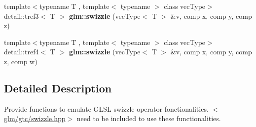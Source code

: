 \begin{DoxyCompactItemize}
\item 
\hypertarget{group__gtc__swizzle_ga93106a77480696f43f6f16653cdab940}{{\footnotesize template$<$typename T , template$<$ typename $>$ class vec\-Type$>$ }\\detail\-::tref3$<$ T $>$ {\bfseries glm\-::swizzle} (vec\-Type$<$ T $>$ \&v, comp x, comp y, comp z)}\label{group__gtc__swizzle_ga93106a77480696f43f6f16653cdab940}

\item 
\hypertarget{group__gtc__swizzle_gab79abf7b57f5482982bc87bfa924920a}{{\footnotesize template$<$typename T , template$<$ typename $>$ class vec\-Type$>$ }\\detail\-::tref4$<$ T $>$ {\bfseries glm\-::swizzle} (vec\-Type$<$ T $>$ \&v, comp x, comp y, comp z, comp w)}\label{group__gtc__swizzle_gab79abf7b57f5482982bc87bfa924920a}

\end{DoxyCompactItemize}


\subsection{Detailed Description}
Provide functions to emulate G\-L\-S\-L swizzle operator fonctionalities. $<$\hyperlink{swizzle_8hpp}{glm/gtc/swizzle.\-hpp}$>$ need to be included to use these functionalities. 

